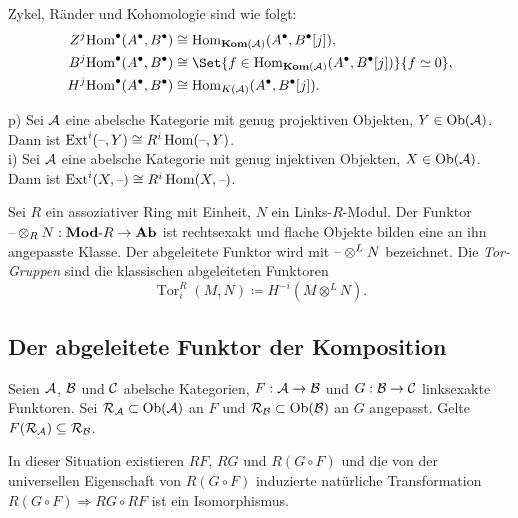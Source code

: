 \documentclass{cheat-sheet}
\newcommand{\CCC}[1]{{#1}^{\bullet}} %
\DeclareMathOperator{\Tor}{Tor} %
\DeclareMathOperator{\Ext}{Ext} %
\newcommand{\Ada}{\mathcal{R}} %
\begin{document}
\begin{bem}
  Zykel, Ränder und Kohomologie sind wie folgt:
  \begin{align*}
    Z^j \CCC{\Hom}(\CCC{A}, \CCC{B}) & \cong \Hom_{\Kom(\Aat)}(\CCC{A}, \CCC{B}[j]), \\
    B^j \CCC{\Hom}(\CCC{A}, \CCC{B}) & \cong \Set{f \in \Hom_{\Kom(\Aat)}(\CCC{A}, \CCC{B}[j])}{f \simeq 0}, \\
    H^j \CCC{\Hom}(\CCC{A}, \CCC{B}) & \cong \Hom_{K(\Aat)}(\CCC{A}, \CCC{B}[j]).
  \end{align*}
\end{bem}

\begin{bem}
  p) \enspace Sei $\mathcal{A}$ eine abelsche Kategorie mit genug projektiven Objekten, $Y \in \operatorname{Ob}(\mathcal{A})$.
  Dann ist $\Ext^i(\blank, Y) \cong R^i \Hom(\blank, Y)$. \\
  i) \enspace Sei $\mathcal{A}$ eine abelsche Kategorie mit genug injektiven Objekten, $X \in \operatorname{Ob}(\mathcal{A})$.
  Dann ist $\Ext^i(X, \blank) \cong R^i \Hom(X, \blank)$.
\end{bem}

\begin{defn}
  Sei $R$ ein assoziativer Ring mit Einheit, $N$ ein Links-$R$-Modul.
  Der Funktor $\text{--} \otimes_R N : \mathbf{Mod}\text{-}{R} \to \mathbf{Ab}$ ist rechtsexakt und flache Objekte bilden eine an ihn angepasste Klasse.
  Der abgeleitete Funktor wird mit $\text{--} \otimes^L N$ bezeichnet.
  Die \emph{Tor-Gruppen} sind die klassischen abgeleiteten Funktoren
  \[ \Tor_i^R(M, N) \coloneqq H^{-i}(M \otimes^L N). \]
\end{defn}

\subsection{Der abgeleitete Funktor der Komposition}

\begin{situation}
  Seien $\mathcal{A}$, $\mathcal{B}$ und $\mathcal{C}$ abelsche Kategorien, $F : \mathcal{A} \to \mathcal{B}$ und $G : \mathcal{B} \to \mathcal{C}$ linksexakte Funktoren.
  Sei $\Ada_\Aat \subset \Ob(\Aat)$ an $F$ und $\Ada_\Bat \subset \Ob(\Bat)$ an $G$ angepasst.
  Gelte $F(\Ada_\Aat) \subseteq \Ada_\Bat$.
\end{situation}

\begin{thm}
  In dieser Situation existieren $RF$, $RG$ und $R(G \circ F)$ und die von der universellen Eigenschaft von $R(G \circ F)$ induzierte natürliche Transformation $R(G \circ F) \Rightarrow RG \circ RF$ ist ein Isomorphismus.
\end{thm}
\end{document}
